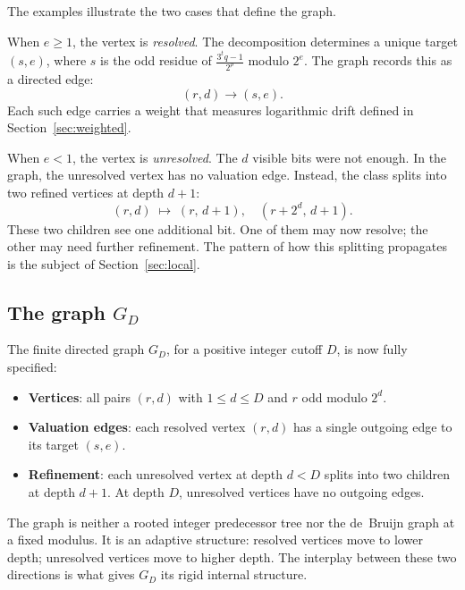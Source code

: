 \documentclass[11pt]{amsart}
\theoremstyle{definition}
\theoremstyle{remark}
\begin{document}
The examples illustrate the two cases that define the graph.

When $e\ge1$, the vertex is \emph{resolved}.  The decomposition determines a unique target $(s,e)$, where $s$ is the odd residue of $\frac{3^tq-1}{2^\rho}$ modulo $2^e$.  The graph records this as a directed edge:
\[
(r,d)\to(s,e).
\]
Each such edge carries a weight that measures logarithmic drift defined in Section~\ref{sec:weighted}.

When $e<1$, the vertex is \emph{unresolved}.  The $d$ visible bits were not enough.  In the graph, the unresolved vertex has no valuation edge.  Instead, the class splits into two refined vertices at depth $d+1$:
\[
(r,d)\;\longmapsto\;(r,\,d+1),\quad (r+2^d,\,d+1).
\]
These two children see one additional bit.  One of them may now resolve; the other may need further refinement.  The pattern of how this splitting propagates is the subject of Section~\ref{sec:local}.

\subsection{The graph $G_D$}

The finite directed graph $G_D$, for a positive integer cutoff $D$, is now fully specified:
\begin{itemize}
\item \textbf{Vertices}: all pairs $(r,d)$ with $1\le d\le D$ and $r$ odd modulo $2^d$.
\item \textbf{Valuation edges}: each resolved vertex $(r,d)$ has a single outgoing edge to its target $(s,e)$.
\item \textbf{Refinement}: each unresolved vertex at depth $d<D$ splits into two children at depth $d+1$.  At depth $D$, unresolved vertices have no outgoing edges.
\end{itemize}

The graph is neither a rooted integer predecessor tree nor the de~Bruijn graph at a fixed modulus.  It is an adaptive structure: resolved vertices move to lower depth; unresolved vertices move to higher depth.  The interplay between these two directions is what gives $G_D$ its rigid internal structure.
\end{document}
